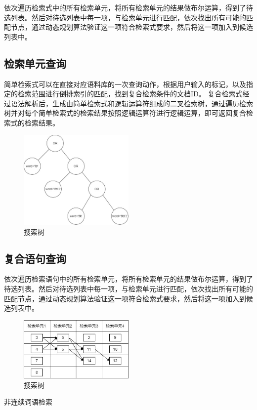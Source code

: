 \documentclass[11pt]{article}
\begin{document}
\begin{CJK*}{UTF8}{gbsn}
依次遍历检索式中的所有检索单元，将所有检索单元的结果做布尔运算，得到了待选列表。然后对待选列表中每一项，与检索单元进行匹配，依次找出所有可能的匹配节点，通过动态规划算法验证这一项符合检索式要求，然后将这一项加入到候选列表中。

\subsection{检索单元查询}

简单检索式可以在直接对应语料库的一次查询动作，根据用户输入的标记，以及指定的检索范围进行倒排索引的匹配，找到复合检索条件的文档ID。
复合检索式经过语法解析后，生成由简单检索式和逻辑运算符组成的二叉检索树，通过遍历检索树并对每个简单检索式的检索结果按照逻辑运算符进行逻辑运算，即可返回复合检索式的检索结果。

\begin{figure}[h]
	\centering
	\includegraphics[width=0.5\textwidth]{node-tree.jpg}
	\caption{搜索树}
\end{figure}


\subsection{复合语句查询}

依次遍历检索语句中的所有检索单元，将所有检索单元的结果做布尔运算，得到了待选列表。然后对待选列表中每一项，与检索单元进行匹配，依次找出所有可能的匹配节点，通过动态规划算法验证这一项符合检索式要求，然后将这一项加入到候选列表中。

\begin{figure}[h]
	\centering
	\includegraphics[width=0.5\textwidth]{dy.jpg}
	\caption{搜索树}
\end{figure}
非连续词语检索


\end{CJK*}
\end{document}
